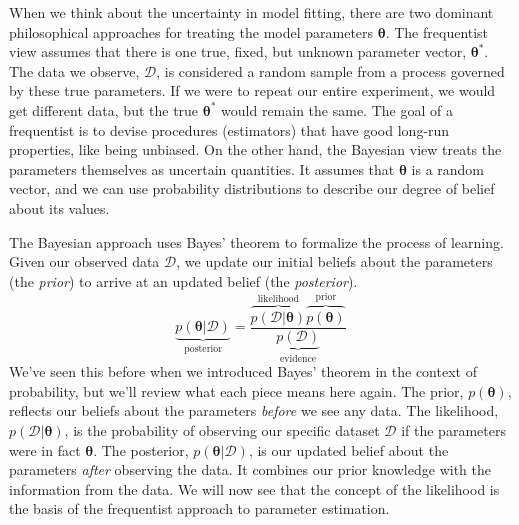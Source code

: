 When we think about the uncertainty in model fitting, there are two dominant philosophical approaches for treating the model parameters $\boldsymbol{\theta}$. The frequentist view assumes that there is one true, fixed, but unknown parameter vector, $\boldsymbol{\theta}^*$. The data we observe, $\mathcal{D}$, is considered a random sample from a process governed by these true parameters. If we were to repeat our entire experiment, we would get different data, but the true $\boldsymbol{\theta}^*$ would remain the same. The goal of a frequentist is to devise procedures (estimators) that have good long-run properties, like being unbiased. On the other hand, the Bayesian view treats the parameters themselves as uncertain quantities. It assumes that $\boldsymbol{\theta}$ is a random vector, and we can use probability distributions to describe our degree of belief about its values.

The Bayesian approach uses Bayes' theorem to formalize the process of learning. Given our observed data $\mathcal{D}$, we update our initial beliefs about the parameters (the \textit{prior}) to arrive at an updated belief (the \textit{posterior}).
\begin{equation}
    \underbrace{p(\boldsymbol{\theta}|\mathcal{D})}_{\text{posterior}} = \frac{\overbrace{p(\mathcal{D}|\boldsymbol{\theta})}^{\text{likelihood}} \overbrace{p(\boldsymbol{\theta})}^{\text{prior}}}{\underbrace{p(\mathcal{D})}_{\text{evidence}}}
    \label{eq:bayes-theorem-annotated}
\end{equation}
We've seen this before when we introduced Bayes' theorem in the context of probability, but we'll review what each piece means here again. The prior, $p(\boldsymbol{\theta})$, reflects our beliefs about the parameters \textit{before} we see any data. The likelihood, $p(\mathcal{D}|\boldsymbol{\theta})$, is the probability of observing our specific dataset $\mathcal{D}$ if the parameters were in fact $\boldsymbol{\theta}$. The posterior, $p(\boldsymbol{\theta}|\mathcal{D})$, is our updated belief about the parameters \textit{after} observing the data. It combines our prior knowledge with the information from the data. We will now see that the concept of the likelihood is the basis of the frequentist approach to parameter estimation.

